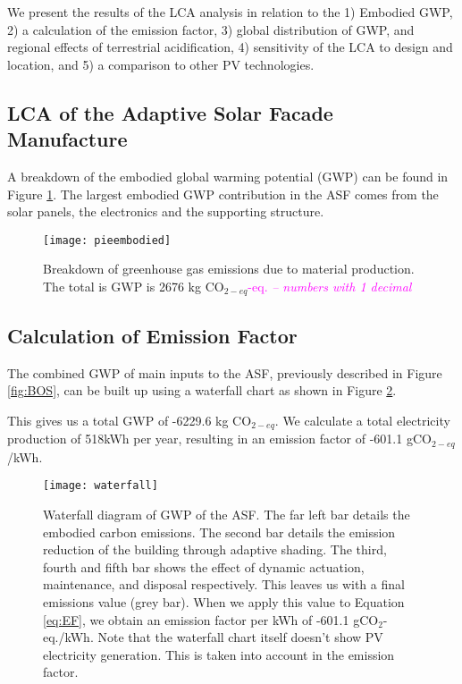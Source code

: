 
We present the results of the LCA analysis in relation to the 1) Embodied GWP, 2) a calculation of the emission factor, 3) global distribution of GWP, and regional effects of terrestrial acidification, 4) sensitivity of the LCA to design and location, and 5) a comparison to other PV technologies.

\subsection{LCA of the Adaptive Solar Facade Manufacture}

A breakdown of the embodied global warming potential (GWP) can be found in Figure  \ref{fig:embodied}. The largest embodied GWP contribution in the ASF comes from the solar panels, the electronics and the supporting structure.

\begin{figure}[H]
\begin{center}
\texttt{[image: pieembodied]}
\caption{Breakdown of greenhouse gas emissions due to material production. The total is GWP is 2676 kg CO$_{2-eq}$\textcolor{magenta}{-eq.  \textit{-- numbers with 1 decimal }} }
\label{fig:embodied}
\end{center}
\end{figure}

\subsection{Calculation of Emission Factor}
The combined GWP of main inputs to the ASF, previously described in Figure \ref{fig:BOS}, can be built up using a waterfall chart as shown in Figure \ref{fig:waterfall}. 

This gives us a total GWP of -6229.6 kg CO$_{2-eq}$. We calculate a total electricity production of 518kWh per year, resulting in an emission factor of -601.1 gCO$_{2-eq}$/kWh.

\begin{figure}[H]
\begin{center}
\texttt{[image: waterfall]}
\caption{Waterfall diagram of GWP of the ASF. The far left bar details the embodied carbon emissions. The second bar details the emission reduction of the building through adaptive shading. The third, fourth and fifth bar shows the effect of dynamic actuation, maintenance, and disposal respectively. This leaves us with a final emissions value (grey bar). When we apply this value to Equation \ref{eq:EF}, we obtain an emission factor per kWh of -601.1 gCO$_2$-eq./kWh. Note that the waterfall chart itself doesn't show PV electricity generation. This is taken into account in the emission factor.}

\label{fig:waterfall}
\end{center}
\end{figure}

